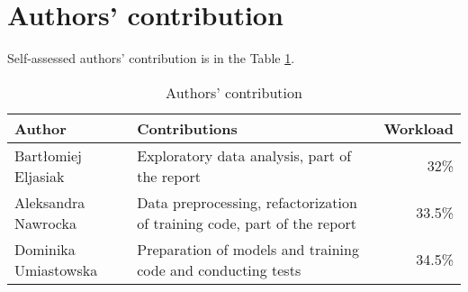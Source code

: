 \section{Authors' contribution}
Self-assessed authors' contribution is in the Table \ref{tab:contribution}.

\begin{table}[h]
\centering
\begin{tabularx}{0.5\textwidth}{XXr}
\textbf{Author} & \textbf{Contributions} & \textbf{Workload} \\\hline
Bartłomiej \mbox{Eljasiak} & Exploratory data analysis, part of the report & 32\% \\\hline
Aleksandra Nawrocka & Data preprocessing, refactorization of training code, part of the report & 33.5\% \\\hline
Dominika \mbox{Umiastowska} & Preparation of models and training code and conducting tests & 34.5\% \\
\end{tabularx}
\caption{Authors' contribution}
\label{tab:contribution}
\end{table}